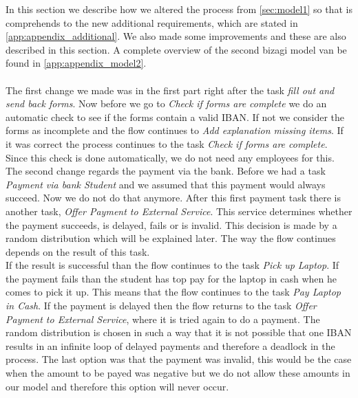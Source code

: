 
In this section we describe how we altered the process from \autoref{sec:model1} so that is comprehends to the new additional requirements, which are stated in \autoref{app:appendix_additional}. We also made some improvements and these are also described in this section. A complete overview of the second bizagi model van be found in \autoref{app:appendix_model2}.\\
\\
The first change we made was in the first part right after the task \emph{fill out and send back forms}. Now before we go to \emph{Check if forms are complete} we do an automatic check to see if the forms contain a valid IBAN. If not we consider the forms as incomplete and the flow continues to \emph{Add explanation missing items}. If it was correct the process continues to the task \emph{Check if forms are complete}. Since this check is done automatically, we do not need any employees for this.\\
The second change regards the payment via the bank. Before we had a task \emph{Payment via bank Student} and we assumed that this payment would always succeed. Now we do not do that anymore. After this first payment task there is another task, \emph{Offer Payment to External Service}. This service determines whether the payment succeeds, is delayed, fails or is invalid. This decision is made by a random distribution which will be explained later. The way the flow continues depends on the result of this task. \\
If the result is successful than the flow continues to the task \emph{Pick up Laptop}. If the payment fails than the student has top pay for the laptop in cash when he comes to pick it up. This means that the flow continues to the task \emph{Pay Laptop in Cash}. If the payment is delayed then the flow returns to the task \emph{Offer Payment to External Service}, where it is tried again to do a payment. The random distribution is chosen in such a way that it is not possible that one IBAN results in an infinite loop of delayed payments and therefore a deadlock in the process. The last option was that the payment was invalid, this would be the case when the amount to be payed was negative but we do not allow these amounts in our model and therefore this option will never occur.
